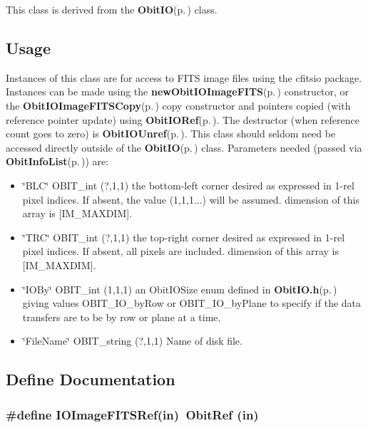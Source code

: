 This class is derived from the {\bf Obit\-IO}{\rm (p.\,\pageref{structObitIO})} class.\subsection{Usage}\label{ObitIOImageFITS_8h_ObitIOImageFITSUsage}
Instances of this class are for access to FITS image files using the cfitsio package. Instances can be made using the {\bf new\-Obit\-IOImage\-FITS}{\rm (p.\,\pageref{ObitIOImageFITS_8c_a19})} constructor, or the {\bf Obit\-IOImage\-FITSCopy}{\rm (p.\,\pageref{ObitIOImageFITS_8c_a24})} copy constructor and pointers copied (with reference pointer update) using {\bf Obit\-IORef}{\rm (p.\,\pageref{ObitIO_8h_a1})}. The destructor (when reference count goes to zero) is {\bf Obit\-IOUnref}{\rm (p.\,\pageref{ObitIO_8h_a0})}. This class should seldom need be accessed directly outside of the {\bf Obit\-IO}{\rm (p.\,\pageref{structObitIO})} class. Parameters needed (passed via {\bf Obit\-Info\-List}{\rm (p.\,\pageref{structObitInfoList})}) are: \begin{itemize}
\item \char`\"{}BLC\char`\"{} OBIT\_\-int (?,1,1) the bottom-left corner desired as expressed in 1-rel pixel indices. If absent, the value (1,1,1...) will be assumed. dimension of this array is [IM\_\-MAXDIM]. \item \char`\"{}TRC\char`\"{} OBIT\_\-int (?,1,1) the top-right corner desired as expressed in 1-rel pixel indices. If absent, all pixels are included. dimension of this array is [IM\_\-MAXDIM]. \item \char`\"{}IOBy\char`\"{} OBIT\_\-int (1,1,1) an Obit\-IOSize enum defined in {\bf Obit\-IO.h}{\rm (p.\,\pageref{ObitIO_8h})} giving values OBIT\_\-IO\_\-by\-Row or OBIT\_\-IO\_\-by\-Plane to specify if the data transfers are to be by row or plane at a time. \item \char`\"{}File\-Name\char`\"{} OBIT\_\-string (?,1,1) Name of disk file.\end{itemize}


\subsection{Define Documentation}
\subsubsection{\setlength{\rightskip}{0pt plus 5cm}\#define IOImage\-FITSRef(in)\ Obit\-Ref (in)}\label{ObitIOImageFITS_8h_a1}


